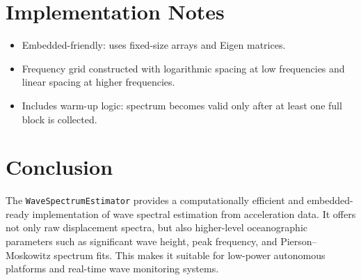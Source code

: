 \documentclass[11pt]{article}
\begin{document}
\section{Implementation Notes}
\begin{itemize}
\item Embedded-friendly: uses fixed-size arrays and Eigen matrices.
\item Frequency grid constructed with logarithmic spacing at low frequencies and linear spacing at higher frequencies.
\item Includes warm-up logic: spectrum becomes valid only after at least one full block is collected.
\end{itemize}

\section{Conclusion}
The \texttt{WaveSpectrumEstimator} provides a computationally efficient and embedded-ready implementation of wave spectral estimation from acceleration data. It offers not only raw displacement spectra, but also higher-level oceanographic parameters such as significant wave height, peak frequency, and Pierson--Moskowitz spectrum fits.
This makes it suitable for low-power autonomous platforms and real-time wave monitoring systems.
\end{document}
